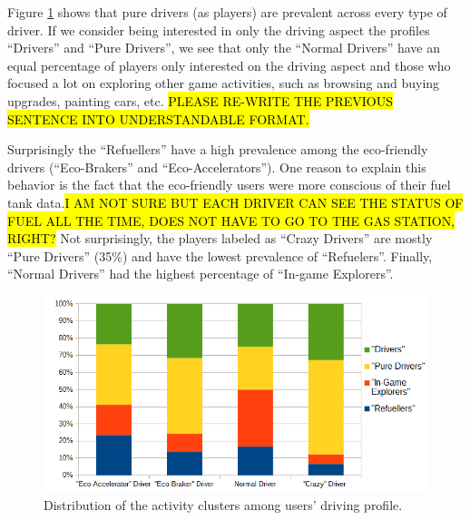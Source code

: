 \documentclass[preprint,authoryear,12pt]{elsarticle}
\begin{document}


Figure \ref{fig:activity_driving} shows that pure drivers (as players) are prevalent across every type of driver.
If we consider being interested in only the driving aspect the profiles ``Drivers'' and ``Pure Drivers'', we see that only the ``Normal Drivers'' have an equal percentage of players only interested on the driving aspect and those who focused a lot on exploring other game activities, such as browsing and buying upgrades, painting cars, etc. \hl{PLEASE RE-WRITE THE PREVIOUS SENTENCE INTO UNDERSTANDABLE FORMAT.}


Surprisingly the ``Refuellers'' have a high prevalence among the eco-friendly drivers (``Eco-Brakers'' and ``Eco-Accelerators''). One reason to explain this behavior is the fact that the eco-friendly users were more conscious of their fuel tank data.\hl{I AM NOT SURE BUT EACH DRIVER CAN SEE THE STATUS OF FUEL ALL THE TIME, DOES NOT HAVE TO GO TO THE GAS STATION, RIGHT?}
Not surprisingly, the players labeled as ``Crazy Drivers'' are mostly ``Pure Drivers'' (35\%) and have the lowest prevalence of ``Refuelers''.
Finally, ``Normal Drivers'' had the highest percentage of ``In-game Explorers''.


\begin{figure}[htb]
	\begin{center}
		\includegraphics[width=.8\linewidth]{ijhcs14-img/cluster_activities_driver_types}
		\caption{Distribution of the activity clusters among users' driving profile.\label{fig:activity_driving}}
	\end{center}
\end{figure}
\end{document}
